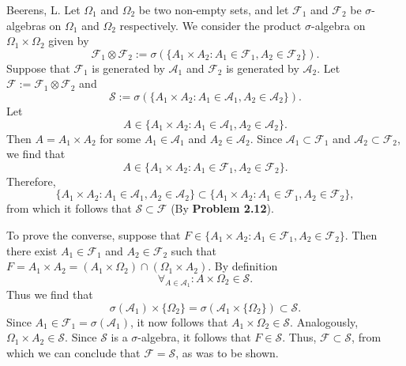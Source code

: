 \begin{solution}[2.13]{Beerens, L.}
    Let $\Omega_1$ and $\Omega_2$ be two non-empty sets, and let $\mathcal{F}_1$ and $\mathcal{F}_2$ be $\sigma$-algebras on $\Omega_1$ and $\Omega_2$ respectively. We consider the product $\sigma$-algebra on $\Omega_1\times\Omega_2$ given by
    $$
        \mathcal{F}_1\otimes\mathcal{F}_2:=\sigma(\{ A_1\times A_2: A_1\in\mathcal{F}_1, A_2\in\mathcal{F}_2 \}).
    $$
    Suppose that $\mathcal{F}_1$ is generated by $\mathcal{A}_1$ and $\mathcal{F}_2$ is generated by $\mathcal{A}_2$. Let $\mathcal{F}:=\mathcal{F}_1\otimes\mathcal{F}_2$ and
    $$
        \mathcal{S}:=\sigma(\{ A_1\times A_2: A_1\in\mathcal{A}_1, A_2\in\mathcal{A}_2 \}).
    $$
    Let
    $$
        A\in\{ A_1\times A_2: A_1\in\mathcal{A}_1, A_2\in\mathcal{A}_2 \}.
    $$
    Then $A=A_1\times A_2$ for some $A_1\in\mathcal{A}_1$ and $A_2\in\mathcal{A}_2$. Since $\mathcal{A}_1\subset\mathcal{F}_1$ and $\mathcal{A}_2\subset\mathcal{F}_2$, we find that
    $$
        A\in\{ A_1\times A_2: A_1\in\mathcal{F}_1, A_2\in\mathcal{F}_2 \}.
    $$
    Therefore,
    $$
        \{ A_1\times A_2: A_1\in\mathcal{A}_1, A_2\in\mathcal{A}_2 \}\subset\{ A_1\times A_2: A_1\in\mathcal{F}_1, A_2\in\mathcal{F}_2 \},
    $$
    from which it follows that $\mathcal{S}\subset\mathcal{F}$ (By \textbf{Problem 2.12}).

    To prove the converse, suppose that $F\in\{ A_1\times A_2: A_1\in\mathcal{F}_1, A_2\in\mathcal{F}_2 \}$. Then there exist $A_1\in\mathcal{F}_1$ and $A_2\in\mathcal{F}_2$ such that $F = A_1\times A_2 = (A_1\times\Omega_2)\cap(\Omega_1\times A_2)$. By definition
    $$
        \forall_{A\in\mathcal{A}_1}: A\times\Omega_2\in \mathcal{S}.
    $$
    Thus we find that
    $$
        \sigma(\mathcal{A}_1)\times \{\Omega_2\} = \sigma(\mathcal{A}_1\times \{\Omega_2\})\subset \mathcal{S}.
    $$
    Since $A_1\in\mathcal{F}_1 = \sigma(\mathcal{A}_1)$, it now follows that $A_1\times\Omega_2\in \mathcal{S}$. Analogously, $\Omega_1\times A_2\in \mathcal{S}$. Since $\mathcal{S}$ is a $\sigma$-algebra, it follows that $F\in \mathcal{S}$. Thus, $\mathcal{F}\subset\mathcal{S}$, from which we can conclude that $\mathcal{F}=\mathcal{S}$, as was to be shown.
\end{solution}

